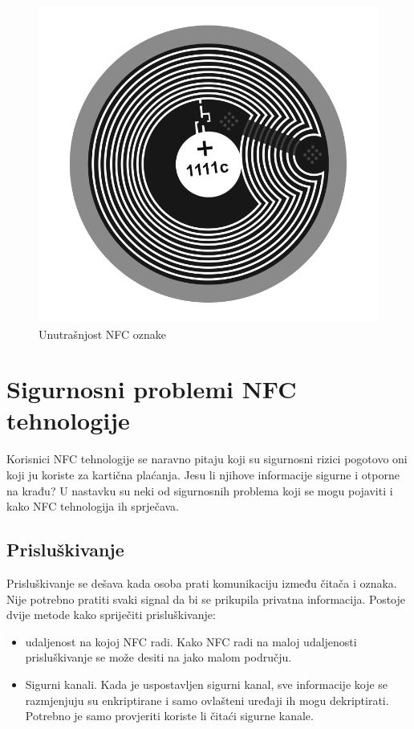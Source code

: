 \documentclass[times, utf8, zavrsni]{fer}
\begin{document}
\begin{figure}[h]
\includegraphics[scale=0.2]{nfctag.png}
\centering
\caption[]{Unutrašnjost NFC oznake \citep{5}}
\centering
\end{figure}

\section{Sigurnosni problemi NFC tehnologije}
Korisnici NFC tehnologije se naravno pitaju koji su sigurnosni rizici pogotovo oni koji ju koriste za kartična plaćanja. Jesu li njihove informacije sigurne i otporne na krađu? U nastavku su neki od sigurnosnih problema koji se mogu pojaviti i kako NFC tehnologija ih sprječava.
\subsection{Prisluškivanje}
Prisluškivanje se dešava kada osoba prati komunikaciju između čitača i oznaka. Nije potrebno pratiti svaki signal da bi se prikupila privatna informacija. Postoje dvije metode kako spriječiti prisluškivanje:
\begin{itemize}
\item udaljenost na kojoj NFC radi. Kako NFC radi na maloj udaljenosti prisluškivanje se može desiti na jako malom području.
\item Sigurni kanali. Kada je uspostavljen sigurni kanal, sve informacije koje se razmjenjuju su enkriptirane i samo ovlašteni uređaji ih mogu dekriptirati. Potrebno je samo provjeriti koriste li čitaći sigurne kanale.
\end{itemize}
\end{document}
